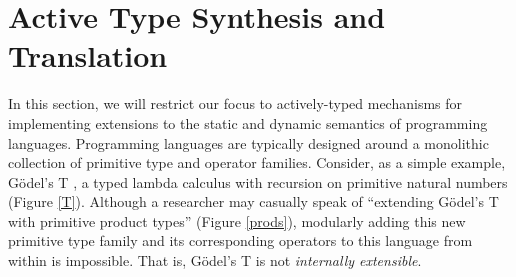 


\section{Active Type Synthesis and Translation}\label{att}

In this section, we will restrict our focus to actively-typed mechanisms for implementing extensions to the static and dynamic semantics of programming languages. Programming languages are typically designed around a monolithic collection of primitive type and operator families. Consider, as a simple example, G\"odel's T \cite{pfpl}, a typed lambda calculus with recursion on primitive natural numbers (Figure \ref{T}). Although a researcher may casually speak of ``extending G\"odel's T with primitive product types'' (Figure \ref{prods}), modularly adding this new primitive type family and its corresponding operators to this language from within is impossible. That is, G\"odel's T is not \emph{internally extensible}.

